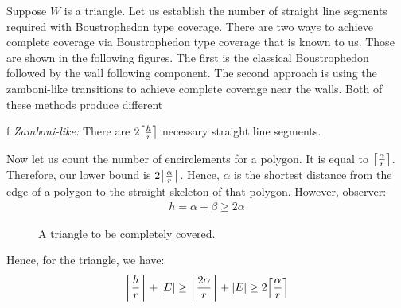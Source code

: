 \documentclass[../main.tex]{subfiles}
\begin{document}
\iffalse
Suppose $W$ is a triangle. Let us establish the number of straight line segments required with Boustrophedon type coverage. There are two ways to achieve complete coverage via Boustrophedon type coverage that is known to us. Those are shown in the following figures. The first is the classical Boustrophedon followed by the wall following component. The second approach is using the zamboni-like transitions to achieve complete coverage near the walls. Both of these methods produce different 

f
\emph{Zamboni-like:} There are $2\ceil*{\frac{h}{r}}$ necessary straight line segments.

Now let us count the number of encirclements for a polygon. It is equal to $\ceil*{\frac{\alpha}{r}}$. Therefore, our lower bound is $2\ceil*{\frac{\alpha}{r}}$. Hence, $\alpha$ is the shortest distance from the edge of a polygon to the straight skeleton of that polygon. However, observer:
\begin{equation}
\begin{aligned}
h=\alpha+\beta\geq2\alpha
\end{aligned}
\end{equation}

\begin{figure}
	\centering
	
	\caption{A triangle to be completely covered.}
	\label{fig:triangle_1}
\end{figure}

Hence, for the triangle, we have:
\begin{equation}
\begin{aligned}
	\ceil*{\frac{h}{r}}+|E|\geq\ceil*{\frac{2\alpha}{r}}+|E|\geq2\ceil*{\frac{\alpha}{r}} 
\end{aligned}
\end{equation}
\end{document}
